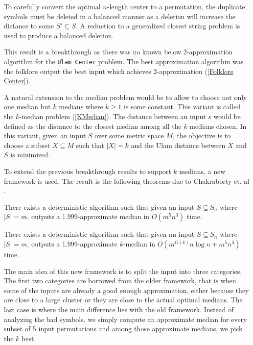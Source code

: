 To carefully convert the optimal $n$-length center to a permutation, the duplicate symbols must be deleted in a balanced manner as a deletion will increase the distance to some $S' \subseteq S$. A reduction to a generalized closest string problem is used to produce a balanced deletion.

This result is a breakthrough as there was no known below 2-approximation algorithm for the \texttt{Ulam Center} problem. The best approximation algorithm was the folklore output the best input which achieves 2-approximation (\ref{Folklore Center}).

A natural extension to the median problem would be to allow to choose not only one median but $k$ medians where $k \geq 1$ is some constant. This variant is called the $k$-median problem (\ref{KMedian}). The distance between an input $s$ would be defined as the distance to the closest median among all the $k$ medians chosen. In this variant, given an input $S$ over some metric space $M$, the objective is to choose a subset $X \subseteq M$ such that $|X| = k$ and the Ulam distance between $X$ and $S$ is minimized.

To extend the previous breakthrough results to support $k$ medians, a new framework is used. The result is the following theorems due to Chakraborty et. al \cite{ClusteringPermutation}.

\begin{theorem}
\label{1999Approx}
    There exists a deterministic algorithm such that given an input $S \subseteq S_n$ where $|S| = m$, outputs a 1.999-approximate median in $O(m^5 n^3)$ time.
\end{theorem}

\begin{theorem}
    There exists a deterministic algorithm such that given an input $S \subseteq S_n$ where $|S| = m$, outputs a 1.999-approximate $k$-median in $O(m^{O(k)} n \log n + m^5 n^3)$ time.
\end{theorem}

The main idea of this new framework is to split the input into three categories. The first two categories are borrowed from the older framework, that is when some of the inputs are already a good enough approximation, either because they are close to a large cluster or they are close to the actual optimal medians. The last case is where the main difference lies with the old framework. Instead of analyzing the bad symbols, we simply compute an approximate median for every subset of 5 input permutations and among those approximate medians, we pick the $k$ best.
